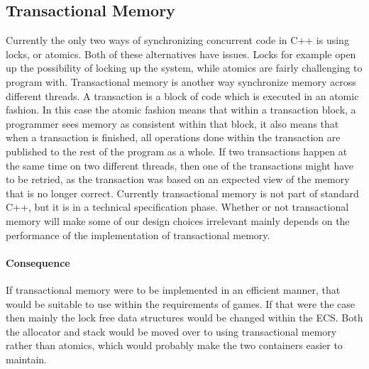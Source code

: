 \subsection{Transactional Memory}
\label{subsec:longevity_transactional_memory}
Currently the only two ways of synchronizing concurrent code in C++
is using locks, or atomics. Both of these alternatives have issues.
Locks for example open up the possibility of locking up the system,
while atomics are fairly challenging to program with.
Transactional memory is another way synchronize memory across different threads.
A transaction is a block of code which is executed in an atomic fashion.
In this case the atomic fashion means that within a transaction block,
a programmer sees memory as consistent within that block,
it also means that when a transaction is finished, all operations done within
the transaction are published to the rest of the program as a whole.
If two transactions happen at the same time on two different threads,
then one of the transactions might have to be retried, as the transaction
was based on an expected view of the memory that is no longer correct\cite{brett_hall_transactional_memory_in_practice}.
Currently transactional memory is not part of standard C++, but it is
in a technical specification phase.
Whether or not transactional memory will make some of our design choices
irrelevant mainly depends on the performance of the implementation of transactional
memory.

\paragraph{Consequence}
If transactional memory were to be implemented in an efficient manner, that would
be suitable to use within the requirements of games.
If that were the case then mainly the lock free data structures would be changed within
the ECS. Both the allocator and stack would be moved over to using transactional memory
rather than atomics, which would probably make the two containers easier to maintain.
